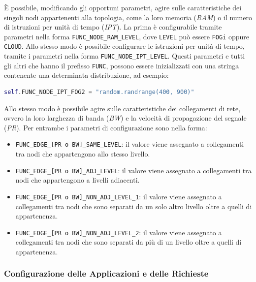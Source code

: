 È possibile, modificando gli opportuni parametri, agire sulle caratteristiche dei singoli nodi appartenenti alla topologia, come la loro memoria (\textit{RAM}) o il numero di istruzioni per unità di tempo (\textit{IPT}). La prima è configurabile tramite parametri nella forma \texttt{FUNC\_NODE\_RAM\_LEVEL}, dove \texttt{LEVEL} può essere \texttt{FOGi} oppure \texttt{CLOUD}. Allo stesso modo è possibile configurare le istruzioni per unità di tempo, tramite i parametri nella forma \texttt{FUNC\_NODE\_IPT\_LEVEL}. Questi parametri e tutti gli altri che hanno il prefisso \texttt{FUNC}, possono essere inizializzati con una stringa contenente una determinata distribuzione, ad esempio:
\begin{lstlisting}[language=python]
	self.FUNC_NODE_IPT_FOG2 = "random.randrange(400, 900)"
\end{lstlisting}

Allo stesso modo è possibile agire sulle caratteristiche dei collegamenti di rete, ovvero la loro larghezza di banda (\textit{BW}) e la velocità di propagazione del segnale (\textit{PR}). Per entrambe i parametri di configurazione sono nella forma:
\begin{itemize}
	\item \texttt{FUNC\_EDGE\_[PR o BW]\_SAME\_LEVEL}: il valore viene assegnato a collegamenti tra nodi che appartengono allo stesso livello.
	\item \texttt{FUNC\_EDGE\_[PR o BW]\_ADJ\_LEVEL}: il valore viene assegnato a collegamenti tra nodi che appartengono a livelli adiacenti.
	\item \texttt{FUNC\_EDGE\_[PR o BW]\_NON\_ADJ\_LEVEL\_1}: il valore viene assegnato a collegamenti tra nodi che sono separati da un solo altro livello oltre a quelli di appartenenza.
	\item \texttt{FUNC\_EDGE\_[PR o BW]\_NON\_ADJ\_LEVEL\_2}: il valore viene assegnato a collegamenti tra nodi che sono separati da più di un livello oltre a quelli di appartenenza.
\end{itemize}

\subsubsection{Configurazione delle Applicazioni e delle Richieste}

